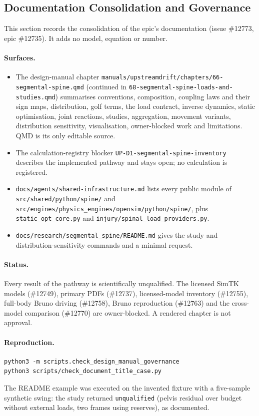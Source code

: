 \subsection{Documentation Consolidation and Governance}
\label{sec:spn-16}

This section records the consolidation of the epic's documentation (issue
\#12773, epic \#12735). It adds no model, equation or number.

\paragraph{Surfaces.}
\begin{itemize}
  \item The design-manual chapter
        \texttt{manuals/upstreamdrift/chapters/66-segmental-spine.qmd} (continued in
        \texttt{68-segmental-spine-loads-and-studies.qmd})
        summarises conventions, composition, coupling laws and their sign maps,
        distribution, golf terms, the load contract, inverse dynamics, static
        optimisation, joint reactions, studies, aggregation, movement variants,
        distribution sensitivity, visualisation, owner-blocked work and
        limitations. QMD is its only editable source.
  \item The calculation-registry blocker
        \texttt{UP-D1-segmental-spine-inventory} describes the implemented
        pathway and stays open; no calculation is registered.
  \item \texttt{docs/agents/shared-infrastructure.md} lists every public module
        of \texttt{src/shared/python/spine/} and
        \texttt{src/engines/physics\_engines/opensim/python/spine/}, plus
        \texttt{static\_opt\_core.py} and
        \texttt{injury/spinal\_load\_providers.py}.
  \item \texttt{docs/research/segmental\_spine/README.md} gives the study and
        distribution-sensitivity commands and a minimal request.
\end{itemize}

\paragraph{Status.}
Every result of the pathway is scientifically unqualified. The licensed SimTK
models (\#12749), primary PDFs (\#12737), licensed-model inventory (\#12755),
full-body Bruno driving (\#12758), Bruno reproduction (\#12763) and the
cross-model comparison (\#12770) are owner-blocked. A rendered chapter is not
approval.

\paragraph{Reproduction.}
\begin{verbatim}
python3 -m scripts.check_design_manual_governance
python3 scripts/check_document_title_case.py
\end{verbatim}
The README example was executed on the invented fixture with a five-sample
synthetic swing: the study returned \texttt{unqualified} (pelvis residual over
budget without external loads, two frames using reserves), as documented.
